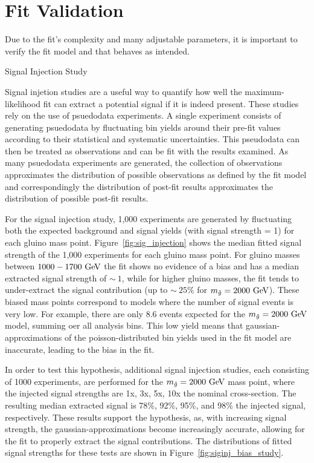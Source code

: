 \chapter{Fit Validation}

Due to the fit's complexity and many adjustable parameters, it is important to verify the fit model and that behaves as intended.

\begin{section}{Signal Injection Study}

Signal injetion studies are a useful way to quantify how well the maximum-likelihood fit can extract a potential signal if it is indeed present.
These studies rely on the use of psuedodata experiments.
A single experiment consists of generating psuedodata by fluctuating bin yields around their pre-fit values according to their statistical and systematic uncertainties.
This pseudodata can then be treated as observations and can be fit with the results examined.
As many psuedodata experiments are generated, the collection of observations approximates the distribution of possible observations as defined by the fit model and correspondingly the distribution of post-fit results approximates the distribution of possible post-fit results.

For the signal injection study, 1,000 experiments are generated by fluctuating both the expected background and signal yields (with signal strength = 1) for each gluino mass point.
Figure~\ref{fig:sig_injection} shows the median fitted signal strength of the 1,000 experiments for each gluino mass point.
For gluino masses between $1000 - 1700~\mathrm{Ge\kern -0.1em V}$ the fit shows no evidence of a bias and has a median extracted signal strength of $\sim~1$, while for higher gluino masses, the fit tends to under-extract the signal contribution (up to $\sim~25\%$ for $m_{\tilde{g}} = 2000~\mathrm{Ge\kern -0.1em V}$).
These biased mass points correspond to models where the number of signal events is very low.
For example, there are only 8.6 events expected for the $m_{\tilde{g}} = 2000~\mathrm{Ge\kern -0.1em V}$ model, summing oer all analysis bins.
This low yield means that gaussian-approximations of the poisson-distributed bin yields used in the fit model are inaccurate, leading to the bias in the fit.

In order to test this hypothesis, additional signal injection studies, each consisting of 1000 experiments, are performed for the $m_{\tilde{g}} = 2000~\mathrm{Ge\kern -0.1em V}$ mass point, where the injected signal strengths are 1x, 3x, 5x, 10x the nominal cross-section.
The resulting median extracted signal is 78\%, 92\%, 95\%, and 98\% the injected signal, respectively.
These results support the hypothesis, as, with increasing signal strength, the gaussian-approximations become increasingly accurate, allowing for the fit to properly extract the signal contributions.
The distributions of fitted signal strengths for these tests are shown in Figure~\ref{fig:siginj_bias_study}.


\end{section}
